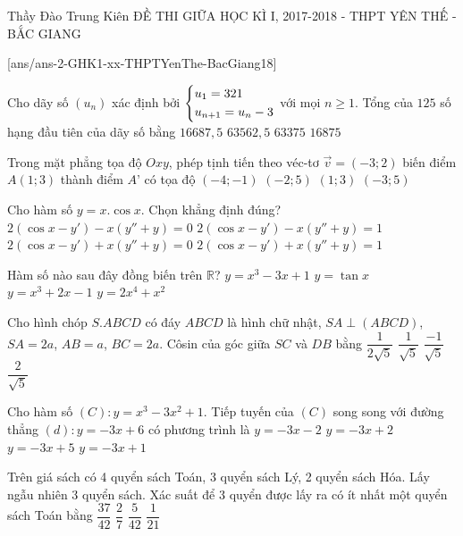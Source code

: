 	\begin{name}
		{Thầy Đào Trung Kiên}
		{ĐỀ THI GIỮA HỌC KÌ I, 2017-2018 - THPT YÊN THẾ - BẮC GIANG}
	\end{name}
	\setcounter{ex}{0}
	[ans/ans-2-GHK1-xx-THPTYenThe-BacGiang18]
	\begin{ex}%
		 Cho dãy số $ ({{u_n}})$ xác định bởi $\left\{\begin{aligned}&u_1= 321\\&u_{n + 1}=u_n- 3\end{aligned}\right.$ với mọi $n \geq 1$. Tổng của $125$ số hạng đầu tiên của dãy số bằng
		\choice
		{$16687,5$}
		{$63562,5$}
		{$63375$}
		{\True $16875$}
	\end{ex}

\begin{ex}%
	Trong mặt phẳng tọa độ $Oxy$, phép tịnh tiến theo véc-tơ $ \overrightarrow v  = (- 3;2)$ biến điểm $ A(1;3)$ thành điểm $A’$ có tọa độ
	\choice
	{$ (- 4;-1)$}
	{\True $(- 2;5)$}
	{$(1;3)$}
	{$ (-3;5)$}
\end{ex}

\begin{ex}%
	Cho hàm số $ y = x.\cos x $. Chọn khẳng định đúng?
	\choice
	{$ 2({\cos x - y'})- x(y'' + y)= 0 $}
	{$ 2({\cos x - y'})- x({y'' + y})= 1 $}
	{\True $ 2({\cos x - y'})+ x({y'' + y})= 0 $}
	{$ 2({\cos x - y'})+ x({y'' + y})= 1 $}
\end{ex}

\begin{ex}%
	Hàm số nào sau đây đồng biến trên $\mathbb{R}$?
	\choice
	{$ y ={x^3}- 3x + 1 $}
	{$ y = \tan x $}
	{\True $ y ={x^3}+ 2x - 1 $}
	{$ y = 2{x^4}+{x^2}$}
\end{ex}
\begin{ex}%
	Cho hình chóp $S.ABCD$ có đáy $ABCD$ là hình chữ nhật, $ SA \perp (ABCD)$, $SA = 2a$, $AB = a$, $BC = 2a$. Côsin của góc giữa $SC$ và $DB$ bằng
	\choice
	{$ \dfrac{1}{{2\sqrt 5}}$}
	{\True $ \dfrac{1}{{\sqrt 5}}$}
	{$ \dfrac{{- 1}}{{\sqrt 5}}$}
	{$ \dfrac{2}{{\sqrt 5}}$}
	\end{ex}
\begin{ex}%
	Cho hàm số $(C): y =x^3-3x^2+ 1 $. Tiếp tuyến của $(C)$ song song với đường thẳng $ (d ):y=-3x+6$ có phương trình là
		\choice
		{$y =-3x-2$}
		{\True $y =  - 3x + 2 $}
		{$y =  - 3x + 5 $}
		{$y=  - 3x + 1 $}
	\end{ex}
\begin{ex}%
	Trên giá sách có 4 quyển sách Toán, 3 quyển sách Lý, 2 quyển sách Hóa. Lấy ngẫu nhiên 3 quyển sách. Xác suất để 3 quyển được lấy ra có ít nhất một quyển sách Toán bằng
		\choice
		{\True $\dfrac{37}{42}$}
		{$\dfrac{2}{7}$}
		{$\dfrac{5}{42}$}
		{$\dfrac{1}{21}$}
	\end{ex}

